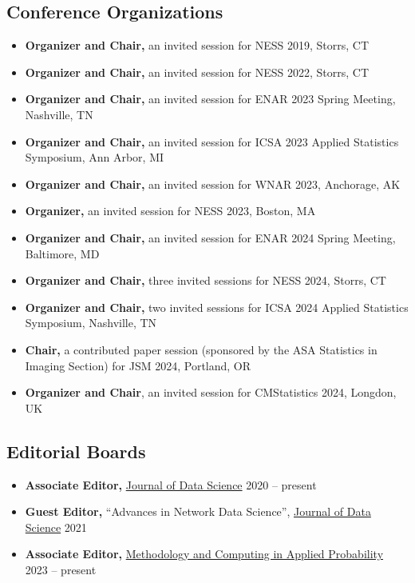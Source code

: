 \documentclass[12pt]{article}
\begin{document}
	\subsection*{Conference Organizations}
	\begin{itemize}
		\item {\bf Organizer and Chair,} an invited session for NESS 
		2019, Storrs, CT
		\item {\bf Organizer and Chair,} an invited session for NESS 
		2022, Storrs, CT
		\item {\bf Organizer and Chair,} an invited session for ENAR 
		2023 Spring Meeting, Nashville, TN
		\item {\bf Organizer and Chair,} an invited session for ICSA 
		2023 Applied Statistics Symposium, Ann Arbor, MI
		\item {\bf Organizer and Chair,} an invited session for WNAR 
		2023, Anchorage, AK
		\item {\bf Organizer,} an invited session for NESS 2023, 
		Boston, MA
		\item {\bf Organizer and Chair,} an invited session for ENAR 
		2024 Spring Meeting, Baltimore, MD
		\item {\bf Organizer and Chair,} three invited sessions for 
		NESS 2024, Storrs, CT
		\item {\bf Organizer and Chair,} two invited sessions for 
		ICSA 2024 Applied Statistics Symposium, Nashville, TN
		\item {\bf Chair,} a contributed paper session (sponsored by 
		the ASA Statistics in Imaging Section) for JSM 2024, 
		Portland, OR
		\item {\bf Organizer and Chair}, an invited session for 
		CMStatistics 2024, Longdon, UK 
	\end{itemize}
	
	
	\subsection*{Editorial Boards}
	\begin{itemize}
		\item \textbf{Associate Editor,} 
		\href{https://jds-online.org/journal/JDS}{Journal of Data Science} \hfill 2020 -- present
		\item \textbf{Guest Editor,} ``Advances in Network Data 
		Science'', \href{https://jds-online.org/journal/JDS}{Journal 
		of Data Science} \hfill 2021
		\item \textbf{Associate Editor,}
		\href{https://www.springer.com/journal/11009/}{Methodology 
		and Computing in Applied Probability} \hfill 2023 -- present
	\end{itemize}
\end{document}

